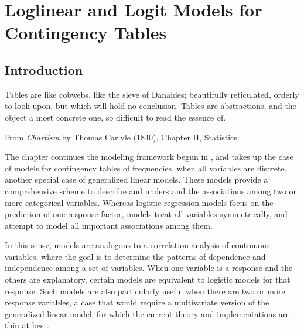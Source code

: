 \documentclass[11pt]{book}\usepackage[]{graphicx}\usepackage[]{color}
\begin{document}






\chapter{Loglinear and Logit Models for Contingency Tables}\label{ch:loglin}


\section{Introduction}\label{sec:loglin-intro}

\epigraph{Tables are like cobwebs, like the
sieve of Danaides; beautifully reticulated, orderly to look upon, but
which will hold no conclusion. Tables are abstractions, and the object a most
concrete one, so difficult to read the essence of.}{From \emph{Chartism} by Thomas Carlyle (1840), Chapter II, Statistics}

The chapter continues the modeling framework begun in ,
and takes up the case of \loglin models for contingency tables of frequencies,
when all variables are discrete, another special case of
generalized linear models.
These models provide a comprehensive scheme to describe and
understand the associations among two or more categorical variables.
Whereas logistic regression models focus on the prediction of one response factor,
\loglin models treat all variables symmetrically, and attempt to
model all important associations among them.

In this sense,
\loglin models are analogous to a correlation analysis of continuous
variables, where the goal is to determine the patterns of dependence
and independence among a set of variables.  
When one variable is a response and the others are explanatory,
certain \loglin models are equivalent to logistic models for that
response.
Such models are also particularly useful
when there are two or more response variables, a case that would require
a multivariate version of the generalized linear model, for which
the current theory and implementations are thin at best.
\end{document}
